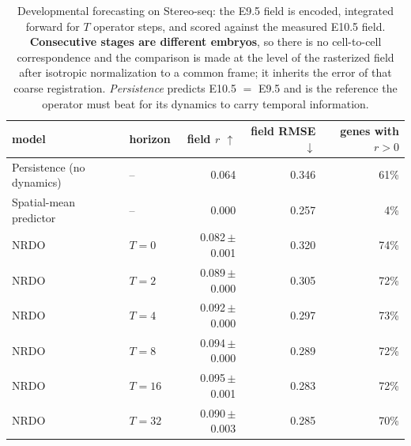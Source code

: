 \begin{table}[htbp]
\centering
\small
\caption{Developmental forecasting on Stereo-seq: the E9.5 field is encoded, integrated forward for $T$ operator steps, and scored against the measured E10.5 field. \textbf{Consecutive stages are different embryos}, so there is no cell-to-cell correspondence and the comparison is made at the level of the rasterized field after isotropic normalization to a common frame; it inherits the error of that coarse registration. \emph{Persistence} predicts E10.5 $=$ E9.5 and is the reference the operator must beat for its dynamics to carry temporal information.}
\label{tab:development}
\begin{tabular}{llrrr}
\toprule
model & horizon & field $r$ $\uparrow$ & field RMSE $\downarrow$ & genes with $r>0$\\
\midrule
Persistence (no dynamics) & -- & 0.064 & 0.346 & 61\% \\
Spatial-mean predictor & -- & 0.000 & 0.257 & 4\% \\
\midrule
NRDO & $T{=}0$ & 0.082\,\tiny{$\pm$ 0.001} & 0.320 & 74\% \\
NRDO & $T{=}2$ & 0.089\,\tiny{$\pm$ 0.000} & 0.305 & 72\% \\
NRDO & $T{=}4$ & 0.092\,\tiny{$\pm$ 0.000} & 0.297 & 73\% \\
NRDO & $T{=}8$ & 0.094\,\tiny{$\pm$ 0.000} & 0.289 & 72\% \\
NRDO & $T{=}16$ & 0.095\,\tiny{$\pm$ 0.001} & 0.283 & 72\% \\
NRDO & $T{=}32$ & 0.090\,\tiny{$\pm$ 0.003} & 0.285 & 70\% \\
\bottomrule
\end{tabular}
\end{table}

